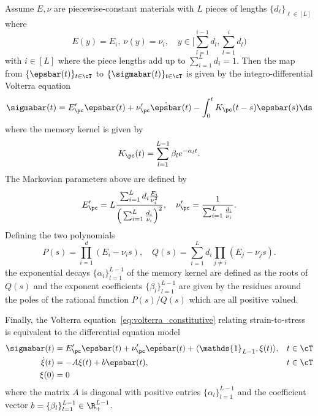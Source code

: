 \documentclass[letterpaper,11pt]{article}
\begin{document}
\begin{proposition}\label{thm:pc_restate}
    Assume $E, \nu$ are piecewise-constant materials with $L$ pieces of lengths $\{d_{\ell}\}_{\ell \in [L]}$ where
    \begin{equation}
        E(y) = E_i, \ \nu(y) = \nu_i, \quad y \in \Big[\sum_{l=1}^{i-1}d_l, \sum_{l=1}^id_l\Big)
    \end{equation}
    with $i \in [L]$ where the piece lengths add up to $\sum_{i=1}^L d_i = 1$. Then the map from $\{\epsbar(t)\}_{t\in \cT}$ to $\{\sigmabar(t)\}_{t\in\cT}$ is given by the integro-differential Volterra equation
    \begin{equation}
        \sigmabar(t) = E_{\pc}'\epsbar(t) + \nu_{\pc}' \dot{\epsbar}(t) - \int_0^t K_{\pc}(t-s) \epsbar(s) \ds
    \end{equation}
    where the memory kernel is given by
    \begin{equation}\label{eq:volterra_constitutive} 
        K_{\pc}(t) = \sum_{l=1}^{L-1} \beta_le^{-\alpha_l t}.
    \end{equation}
    The Markovian parameters above are defined by
    \begin{equation}\label{eqn:PC-E-nu}
        E'_{\pc} = L\frac{\sum_{i=1}^Ld_i\frac{E_i}{\nu_i^2}}{\Big(\sum_{i=1}^L\frac{d_i}{\nu_i}\Big)^2}, \quad \nu_{\pc}' = \frac{1}{\sum_{i=1}^L\frac{d_i}{\nu_i}}.
    \end{equation}
    Defining the two polynomials
    \begin{equation}
        P(s) = \prod_{i=1}^d(E_i - \nu_i s), \quad Q(s) = \sum_{i=1}^Ld_i\prod_{j \neq i}(E_j - \nu_j s).
    \end{equation}
    the exponential decays $\{\alpha_l\}_{l=1}^{L-1}$ of the memory kernel are defined as the roots of $Q(s)$ and the exponent coefficients $\{\beta_l\}_{l=1}^{L-1}$ are given by the residues around the poles of the rational function $P(s)/Q(s)$ which are all positive valued.
    
    Finally, the Volterra equation~\eqref{eq:volterra_constitutive} relating strain-to-stress is equivalent to the differential equation model
    \begin{equation}\label{eq:diffeq_constitutive}
    \begin{aligned}
        \sigmabar(t) &= E'_{\pc}\epsbar(t) + \nu'_{\pc}\dot{\epsbar}(t) + \langle \mathds{1}_{L-1}, \xi(t) \rangle, && t \in \cT\\
        \dot{\xi}(t) & = -A\xi(t) + b\epsbar(t), && t \in \cT\\
        \xi(0) & = 0
    \end{aligned}
    \end{equation}
    where the matrix $A$ is diagonal with positive entries $\{\alpha_l\}_{l=1}^{L-1}$ and the coefficient vector $b = \{\beta_l\}_{l=1}^{L-1} \in \R_+^{L-1}$.
\end{proposition}
\end{document}
